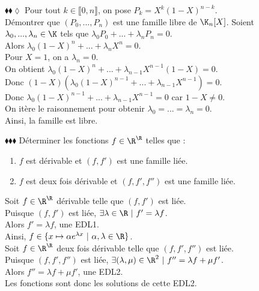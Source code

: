 \documentclass[11pt]{article}
\begin{document}
\begin{exercice}{$\blacklozenge\blacklozenge\lozenge$}{}
    Pour tout $k \in \llbracket 0, n \rrbracket$, on pose $P_k = X^k(1-X)^{n-k}$.\\
    Démontrer que $(P_0, ..., P_n)$ est une famille libre de $\K_n[X]$.
    \tcblower
    Soient $\lambda_0, ..., \lambda_n \in \K$ tels que $\lambda_0P_0 + ... + \lambda_nP_n = 0$.\\ 
    Alors $\lambda_0(1-X)^n + ... + \lambda_nX^n = 0$.\\
    Pour $X = 1$, on a $\lambda_n = 0$.\\
    On obtient $\lambda_0(1-X)^n + ... + \lambda_{n-1}X^{n-1}(1-X) = 0$.\\
    Donc $(1-X)\left(\lambda_0(1-X)^{n-1} + ... + \lambda_{n-1}X^{n-1}\right) = 0$.\\
    Donc $\lambda_0(1-X)^{n-1} + ... + \lambda_{n-1}X^{n-1} = 0$ car $1-X \neq 0$.\\
    On itère le raisonnement pour obtenir $\lambda_0 = ... = \lambda_{n} = 0$.\\
    Ainsi, la famille est libre.
\end{exercice}

\begin{exercice}{$\blacklozenge\blacklozenge\blacklozenge$}{}
    Déterminer les fonctions $f\in\R^\R$ telles que :
    \begin{enumerate}
        \item $f$ est dérivable et $(f,f')$ est une famille liée.
        \item $f$ est deux fois dérivable et $(f, f', f'')$ est une famille liée.
    \end{enumerate}
    \tcblower
     Soit $f\in\R^\R$ dérivable telle que $(f, f')$ est liée.\\
    Puisque $(f,f')$ est liée, $\exists \lambda \in \R ~ | ~ f' = \lambda f$.\\
    Alors $f' = \lambda f$, une EDL1.\\
    Ainsi, $f \in \{x \mapsto \alpha e^{\lambda x} ~ | ~ \alpha, \lambda \in \R\}$.\\[0.3cm]
     Soit $f\in\R^\R$ deux fois dérivable telle que $(f, f', f'')$ est liée.\\
    Puisque $(f, f', f'')$ est liée, $\exists (\lambda, \mu) \in \R^2 ~ | ~ f'' = \lambda f + \mu f'$.\\
    Alors $f'' = \lambda f + \mu f'$, une EDL2.\\
    Les fonctions sont donc les solutions de cette EDL2.
\end{exercice}
\end{document}

